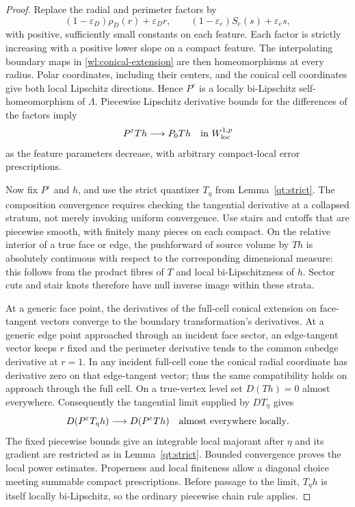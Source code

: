 \begin{proof}
Replace the radial and perimeter factors by
\[
 (1-\varepsilon_D)\rho_D(r)+\varepsilon_Dr,
 \qquad (1-\varepsilon_e)S_e(s)+\varepsilon_es,
\]
with positive, sufficiently small constants on each feature.  Each
factor is strictly increasing with a positive lower slope on a
compact feature.  The interpolating boundary maps in
\eqref{wl:conical-extension} are then homeomorphisms at every radius.
Polar coordinates, including their centers, and the conical cell
coordinates give both local Lipschitz directions.  Hence
$P^{\varepsilon}$ is a locally bi-Lipschitz self-homeomorphism of
$\Lambda$.  Piecewise Lipschitz derivative bounds for the differences
of the factors imply
\[
 P^{\varepsilon}Th\longrightarrow P_0Th
       \quad\hbox{in }W^{1,p}_{\rm loc}
\]
as the feature parameters decrease, with arbitrary compact-local
error prescriptions.

Now fix $P^{\varepsilon}$ and $h$, and use the strict quantizer
$T_\eta$ from Lemma~\ref{qt:strict}.  The composition convergence
requires checking the tangential derivative at a collapsed stratum,
not merely invoking uniform convergence.  Use stairs and cutoffs
that are piecewise smooth, with finitely many pieces on each compact.
On the relative interior of a true face or edge, the pushforward of
source volume by $Th$ is absolutely continuous with respect to the
corresponding dimensional measure: this follows from the product
fibres of $T$ and local bi-Lipschitzness of $h$.  Sector cuts and stair
knots therefore have null inverse image within these strata.

At a generic face point, the derivatives of the full-cell conical
extension on face-tangent vectors converge to the boundary
transformation's derivatives.  At a generic edge point approached
through an incident face sector, an edge-tangent vector keeps $r$
fixed and the perimeter derivative tends to the common subedge
derivative at $r=1$.  In any incident full-cell cone the conical
radial coordinate has derivative zero on that edge-tangent vector;
thus the same compatibility holds on approach through the full
cell.  On a true-vertex level set $D(Th)=0$ almost everywhere.
Consequently the tangential limit supplied by $DT_\eta$ gives
\[
 D(P^{\varepsilon}T_\eta h)
      \longrightarrow D(P^{\varepsilon}Th)
       \quad\hbox{almost everywhere locally}.
\]
The fixed piecewise bounds give an integrable local majorant after
$\eta$ and its gradient are restricted as in
Lemma~\ref{qt:strict}.  Bounded convergence proves the local
power estimates.  Properness and local finiteness allow a diagonal
choice meeting summable compact prescriptions.  Before passage to
the limit, $T_\eta h$ is itself locally bi-Lipschitz, so the ordinary
piecewise chain rule applies.
\end{proof}

